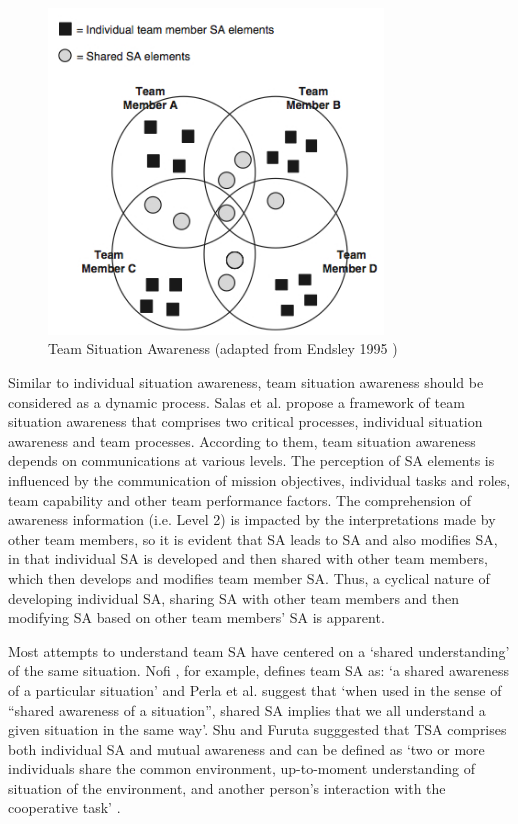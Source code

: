 \begin{figure}[htbp] %
   \centering
   \includegraphics[width=3.5in]{TSA.jpg} 
   \caption{Team Situation Awareness (adapted from Endsley 1995 \cite{Endsley1995})}
   \label{fig:tsa}
\end{figure}

Similar to individual situation awareness, team situation awareness should be considered as a dynamic process. Salas et al. \cite{salas1995situation} propose a framework of team situation awareness that comprises two critical processes, individual situation awareness and team processes. According to them, team situation awareness depends on communications at various levels. The perception of SA elements is influenced by the communication of mission objectives, individual tasks and roles, team capability and other team performance factors. The comprehension of awareness information (i.e. Level 2) is impacted by the interpretations made by other team members, so it is evident that SA leads to SA and also modifies SA, in that individual SA is developed and then shared with other team members, which then develops and modifies team member SA. Thus, a cyclical nature of developing individual SA, sharing SA with other team members and then modifying SA based on other team members’ SA is apparent. 

Most attempts to understand team SA have centered on a `shared understanding' of the same situation. Nofi \cite{nofi2000defining}, for example, defines team SA as: `a shared awareness of a particular situation' and Perla et al. \cite{perla2000gaming} suggest that `when used in the sense of ``shared awareness of a situation'', shared SA implies that we all understand a given situation in the same way'. Shu and Furuta sugggested that TSA comprises both individual SA and mutual awareness and can be defined as `two or more individuals share the common environment, up-to-moment understanding of situation of the environment, and another person's interaction with the cooperative task' \cite{shu2005inference}.


